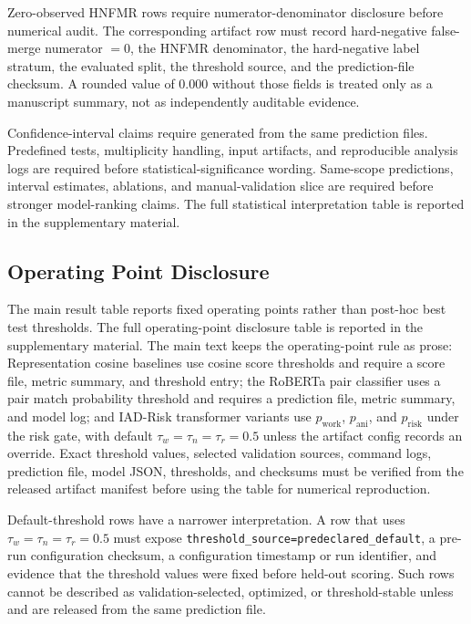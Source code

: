 \documentclass[preprint,12pt]{elsarticle}
\begin{document}
Zero-observed HNFMR rows require numerator-denominator disclosure before numerical audit. The corresponding artifact row must record hard-negative false-merge numerator $=0$, the HNFMR denominator, the hard-negative label stratum, the evaluated split, the threshold source, and the prediction-file checksum. A rounded value of 0.000 without those fields is treated only as a manuscript summary, not as independently auditable evidence.

Confidence-interval claims require  generated from the same prediction files. Predefined tests, multiplicity handling, input artifacts, and reproducible analysis logs are required before statistical-significance wording. Same-scope predictions, interval estimates, ablations, and manual-validation slice are required before stronger model-ranking claims. The full statistical interpretation table is reported in the supplementary material.

\subsection{Operating Point Disclosure}

The main result table reports fixed operating points rather than post-hoc best test thresholds. The full operating-point disclosure table is reported in the supplementary material. The main text keeps the operating-point rule as prose: Representation cosine baselines use cosine score thresholds and require a score file, metric summary, and threshold entry; the RoBERTa pair classifier uses a pair match probability threshold and requires a prediction file, metric summary, and model log; and IAD-Risk transformer variants use $p_{\mathrm{work}}$, $p_{\mathrm{ani}}$, and $p_{\mathrm{risk}}$ under the risk gate, with default $\tau_w=\tau_n=\tau_r=0.5$ unless the artifact config records an override. Exact threshold values, selected validation sources, command logs, prediction file, model JSON, thresholds, and checksums must be verified from the released artifact manifest before using the table for numerical reproduction.

Default-threshold rows have a narrower interpretation. A row that uses $\tau_w=\tau_n=\tau_r=0.5$ must expose \texttt{threshold\_source=predeclared\_default}, a pre-run configuration checksum, a configuration timestamp or run identifier, and evidence that the threshold values were fixed before held-out scoring. Such rows cannot be described as validation-selected, optimized, or threshold-stable unless  and  are released from the same prediction file.
\end{document}
